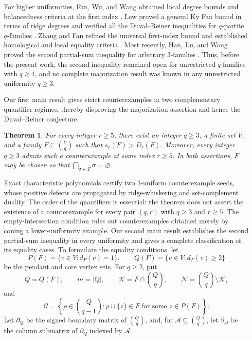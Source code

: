\documentclass[11pt]{article}
\newtheorem{theorem}{Theorem}[section]
\newcommand{\bd}{\partial}
\newcommand{\calC}{\mathcal{C}}
\newcommand{\calK}{\mathcal{K}}
\newcommand{\calN}{\mathcal{N}}
\begin{document}
For higher uniformities, Fan, Wu, and Wang obtained local degree bounds
and balancedness criteria at the first index
\cite{FanWuWang2025}. Lew proved a general Ky Fan bound in terms of ridge
degrees and verified all the Duval--Reiner inequalities for
\(q\)-partite \(q\)-families \cite{Lew2025}. Zhang and Fan refined the
universal first-index bound and established homological and local
equality criteria \cite{ZhangFan2026}. Most recently, Han, Lu, and Wang
proved the second partial-sum inequality for arbitrary \(3\)-families
\cite{HanLuWang2026}. Thus, before the present work, the second
inequality remained open for unrestricted \(q\)-families with \(q\ge4\),
and no complete majorization result was known in any unrestricted
uniformity \(q\ge3\).


Our first main result gives strict counterexamples in two complementary
quantifier regimes, thereby disproving the majorization assertion and
hence the Duval--Reiner conjecture.
\begin{theorem}
\label{thm:counterexamples}
For every integer \(r\ge5\), there exist an integer \(q\ge3\), a finite
set \(V\), and a family \(F\subseteq\binom{V}{q}\) such that
$s_r(F)> D_r(F).$
Moreover, every integer \(q\ge3\) admits such a counterexample at some
index \(r\ge5\). In both assertions, \(F\) may be chosen so that
$\bigcap_{\sigma\in F}\sigma=\varnothing.$
\end{theorem}
Exact characteristic polynomials certify two
\(3\)-uniform counterexample seeds, whose positive defects are propagated
by ridge-whiskering and set-complement duality.
The order of the quantifiers is essential: the theorem does not assert
the existence of a counterexample for every pair \((q,r)\) with
\(q\ge3\) and \(r\ge5\). The empty-intersection condition rules out
counterexamples obtained merely by coning a lower-uniformity example.
Our second main result establishes the second partial-sum inequality in
every uniformity and gives a complete classification of its equality
cases.
To formulate the equality conditions, let
\[
P(F)=\{v\in V:d_F(v)=1\},
\qquad
Q(F)=\{v\in V:d_F(v)\ge2\}
\]
be the pendant and core vertex sets. For \(q\ge2\), put
\[
Q=Q(F),\qquad
m=|Q|,\qquad
\calK=F\cap\binom Qq,\qquad
\calN=\binom Qq\setminus\calK,
\]
and
\[
\calC=
\left\{
\rho\in\binom Q{q-1}:
\rho\cup\{z\}\in F
\text{ for some }z\in P(F)
\right\}.
\]
Let \(\bd_Q\) be the signed boundary matrix of \(\binom Qq\), and, for
\(\mathcal A\subseteq\binom Qq\), let \(\bd_{\mathcal A}\) be the column
submatrix of \(\bd_Q\) indexed by \(\mathcal A\).
\end{document}

